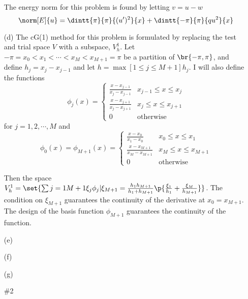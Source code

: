 \documentclass[11pt, oneside]{article}
\begin{document}
\begin{enumerate}
      The energy norm for this problem is found by letting $v = u - w$
      \[
        \norm[E]{u} = \dintt{\pi}{\pi}{(u')^2}{x} + \dintt{-\pi}{\pi}{qu^2}{x}
      \]

    \item[(d)]
      The cG(1) method for this problem is formulated by replacing the test and
      trial space $V$ with a subspace, $V^1_h$.
      Let $-\pi = x_0 < x_1 < \cdots < x_M < x_{M+1} = \pi$ be a partition of
      $\br{-\pi, \pi}$, and define $h_j = x_{j} - x_{j-1}$ and let
      $h = \max[1 \le j \le M+1]{h_j}$.
      I will also define the functions
      \[
        \phi_j(x) =
        \begin{cases}
          \frac{x - x_{j-1}}{x_j - x_{j-1}} & x_{j-1} \le x \le x_j \\
          \frac{x - x_{j+1}}{x_j - x_{j+1}} & x_{j} \le x \le x_{j+1} \\
          0 & \text{otherwise}
        \end{cases}
      \]
      for $j = 1, 2, \cdots, M$ and
      \[
        \phi_0(x) = \phi_{M+1}(x) =
        \begin{cases}
          \frac{x - x_{0}}{x_1 - x_0} & x_{0} \le x \le x_1 \\
          \frac{x - x_{M+1}}{x_M - x_{M+1}} & x_M \le x \le x_{M+1} \\
          0 & \text{otherwise}
        \end{cases}
      \]

      Then the space $V^1_h = \set{\sum{j = 1}{M+1}{\xi_j \phi_j} | \xi_{M+1} = \frac{h_1 h_{M+1}}{h_1 + h_{M+1}}\p{\frac{\xi_1}{h_1} + \frac{\xi_M}{h_{M+1}}}}$.
      The condition on $\xi_{M+1}$ guarantees the continuity of the derivative
      at $x_0 = x_{M+1}$.
      The design of the basis function $\phi_{M+1}$ guarantees the continuity of
      the function.

    \item[(e)]

    \item[(f)]
    \item[(g)]

  \item[\#2]

\end{enumerate}
\end{document}
